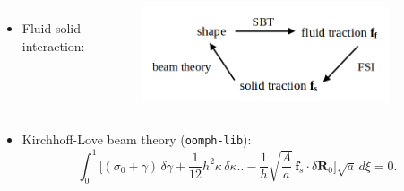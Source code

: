 \documentclass{beamer}
\newcommand{\bi}{\begin{itemize}}
\newcommand{\ei}{\end{itemize}}
\begin{document}
\begin{frame}
\begin{overlayarea}{\textwidth}{\textheight}
\vspace{0.2cm}
		\begin{columns}
				\vspace{-0.6cm} 
			\bi
			\item Fluid-solid interaction: 
			\ei
			 \vspace{-0.35cm}
			\begin{figure}[htb]
				\begin{center}
					\includegraphics[width=0.9\textwidth]{plots/logic.png}
				\end{center}
			\end{figure}
		\end{columns}\vspace{0.1cm}
		\bi 
		\item \small Kirchhoff-Love beam theory (\texttt{oomph-lib}):
		\vspace{-0.1cm} \footnotesize 
		\begin{equation*}
			\int_0^1 \Bigg[ (\sigma_0 + \gamma)\, \delta \gamma 
			+ \frac{1}{12} h^2 \kappa\, \delta \kappa \Bigg. 
			\Bigg. - \frac{1}{h} \sqrt{\frac{A}{a}}\, \textbf{f}_s \cdot \delta \textbf{R}_0 \Bigg] \sqrt{a}\, d\xi = 0.
		\end{equation*}
		\ei 
	\end{overlayarea}
\end{frame}

\end{document}
